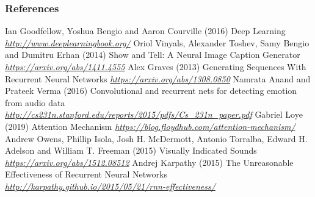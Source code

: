 \begin{vbframe}
\frametitle{References}
\footnotesize{
\begin{thebibliography}{99}
 Ian Goodfellow, Yoshua Bengio and Aaron Courville (2016)
\newblock Deep Learning
\newblock \emph{\url{http://www.deeplearningbook.org/}}
 Oriol Vinyals, Alexander Toshev, Samy Bengio and Dumitru Erhan (2014)
\newblock Show and Tell: A Neural Image Caption Generator
\newblock \emph{\url{https://arxiv.org/abs/1411.4555}}
 Alex Graves (2013)
\newblock Generating Sequences With Recurrent Neural Networks
\newblock \emph{\url{https://arxiv.org/abs/1308.0850}}
 Namrata Anand and Prateek Verma (2016)
\newblock Convolutional and recurrent nets for detecting emotion from audio data
\newblock \emph{\url{http://cs231n.stanford.edu/reports/2015/pdfs/Cs_231n_paper.pdf}}
 Gabriel Loye (2019)
\newblock Attention Mechanism
\newblock \emph{\url{https://blog.floydhub.com/attention-mechanism/}}
 Andrew Owens, Phillip Isola, Josh H. McDermott, Antonio Torralba, Edward H. Adelson and  William T. Freeman (2015)
\newblock Visually Indicated Sounds
\newblock \emph{\url{https://arxiv.org/abs/1512.08512}}
 Andrej Karpathy (2015)
\newblock The Unreasonable Effectiveness of Recurrent Neural Networks
\newblock \emph{\url{http://karpathy.github.io/2015/05/21/rnn-effectiveness/}}

\end{thebibliography}}
\end{vbframe}
